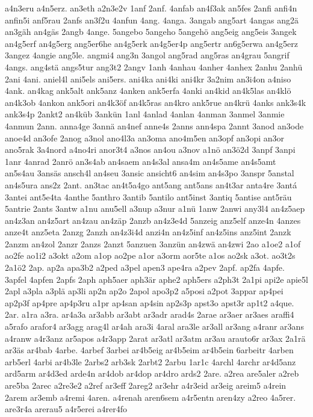 {a4n3eru
a4n5erz.
an3eth
a2n3e2v
1anf
2anf.
4anfab
an4f3ak
an5fes
2anfi
anfi4n
anfin5i
anf5rau
2anfs
an3f2u
4anfun
4ang.
4anga.
3angab
ang5art
4angas
ang2ä
an3gäh
an4gäs
2angb
4ange.
5angebo
5angeho
5angehö
ang5eig
ang5eis
3angek
an4g5erf
an4g5erg
ang5er6he
an4g5erk
an4g5er4p
ang5ertr
an6g5erwa
an4g5erz
3angez
4angie
ang5le.
angmi4
ang3n
3angol
ang5rad
ang5ras
an4grau
5angrif
4angs.
ang4stä
angs5tur
ang3t2
2angv
1anh
4anhau
4anher
4anhex
2anhu
2anhü
2ani
4ani.
aniel4l
ani5els
ani5ers.
ani4ka
ani4ki
ani4kr
3a2nim
an3i4on
a4niso
4ank.
an4kag
ank5alt
ank5anz
4anken
ank5erfa
4anki
an4kid
an4k5las
an4klö
an4k3ob
4ankon
ank5ori
an4k3öf
an4k5ras
an4kro
ank5rue
an4krü
4anks
ank3s4k
ank3s4p
2ankt2
an4küb
3ankün
1anl
4anlad
4anlan
4anman
3anmel
3anmie
4anmun
2ann.
anna4ge
3annä
an4nef
anne4s
2anns
ann4spa
2annt
3anod
an3ode
anoe4d
an3ofe
2anog
a3nol
ano4l3a
an3oma
ano4m5en
an3opf
an3opi
an3or
ano5rak
3a4nord
a4no4ri
anor3t4
a3nos
an4ou
a3nov
a1nö
an3ö2d
3anpf
3anpi
1anr
4anrad
2anrö
an3s4ab
an4saem
an4s3al
ansa4m
an4s5ame
an4s5amt
an5s4au
3ansäs
ansch4l
an4seu
3ansic
ansicht6
an4sim
an4s3po
3anspr
5anstal
an4s5ura
ans2z
2ant.
an3tac
an4t5a4go
ant5ang
ant5ans
an4t3ar
anta4re
3antá
3antei
ant5e4ta
4anthe
5anthro
3antib
5antilo
ant5inst
3antiq
5antise
ant5räu
5antrie
2ants
3antw
a1nu
anu5ell
a3nup
a3nur
a1nü
1anw
2anwi
any3l4
an4z5aep
an4z3an
an4z5art
an4zau
an4zäp
2anzb
an4z3e4d
5anzeig
anz5elf
anze4n
4anzes
anze4t
anz5eta
2anzg
2anzh
an4z3i4d
anzi4n
an4z5inf
an4z5ins
anz5int
2anzk
2anzm
an4zol
2anzr
2anzs
2anzt
5anzuen
3anzün
an4zwä
an4zwi
2ao
a1oe2
a1of
ao2fe
ao1i2
a3okt
a2om
a1op
ao2pe
a1or
a3orm
aor5te
a1os
ao2sk
a3ot.
ao3t2s
2a1ö2
2ap.
ap2a
apa3b2
a2ped
a3pel
apen3
ape4ra
a2pev
2apf.
ap2fa
4apfe.
3apfel
4apfen
2apfs
2aph
aph5aer
aph3är
aphe2
aph5ers
a2ph3t
2a1pi
api2e
apie5l
2apl
a3pla
a3plä
ap3li
ap2n
ap2o
2apol
apo3p2
a5posi
a2pot
3appar
ap4pei
ap2p3f
ap4pre
ap4p3ru
a1pr
ap4san
ap4sin
ap2s3p
apst3o
apst3r
ap1t2
a4que.
2ar.
a1ra
a3ra.
ar4a3a
ar3abb
ar3abt
ar3adr
arad4s
2arae
ar3aer
ar3aes
araffi4
a5rafo
arafor4
ar3agg
arag4l
ar4ah
ara3i
4aral
ara3le
ar3all
ar3ang
a4ranr
ar3ans
a4ranw
a4r3anz
ar5apos
a4r3app
2arat
ar3atl
ar3atm
ar3au
arauto6r
ar3ax
2a1rä
ar3äs
ar4bab
4arbe.
4arbef
3arbei
ar4b5eig
ar4b5eim
ar4b5ein
6arbeitr
4arben
arb5erl
4arbi
ar4b3le
2arbs2
arb3sk
2arbt2
2arbu
1ar1c
4archl
4archr
ar4d5anz
ard5arm
ar4d3ed
arde4n
ar4dob
ar4dop
ar4dro
ards2
2are.
a2rea
are5aler
a2reb
are5ba
2arec
a2re3e2
a2ref
ar3eff
2areg2
ar3ehr
a4r3eid
ar3eig
areim5
a4rein
2arem
ar3emb
a4remi
4aren.
a4renah
aren6sem
a4r5entn
aren4zy
a2reo
4a5rer.
are3r4a
arerau5
a4r5erei
a4rer4fo
}
